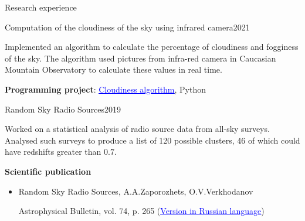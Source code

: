 \documentclass{resume} %
\newcommand{\link}[2]{\href{#1}{\textcolor{blue}{\underline{#2}}}}
\newcommand{\subheader}[2]{
	{\textbf{#1}} \ifthenelse{\equal{#2}{}}{}{\timestamp{#2}}
}
\begin{document}
\begin{rSection}{Research experience}
		\begin{rSubsection}{Computation of the cloudiness of the sky using infrared camera}{2021}{}{}{}
			\item Implemented an algorithm to calculate the percentage of cloudiness and fogginess of the sky. The algorithm used pictures from infra-red camera in Caucasian Mountain Observatory to calculate these values in real time.
			\item \textbf{Programming project}: \link{https://github.com/Kraysent/cloudiness}{Cloudiness algorithm}, Python 
		\end{rSubsection}

		\begin{rSubsection}{Random Sky Radio Sources}{2019}{}{}{}
			\item Worked on a statistical analysis of radio source data from all-sky surveys. Analysed such surveys to produce a list of 120 possible clusters, 46 of which could have redshifts greater than $0.7$.
			\item \subheader{Scientific publication}{}
			\begin{itemize}
				\item Random Sky Radio Sources, A.A.Zaporozhets, O.V.Verkhodanov 
			
				Astrophysical Bulletin, vol. 74, p. 265 (\link{http://www.sao.ru/Doc-k8/Science/Public/Bulletin/Vol74/N3/ASPB265.pdf}{Version in Russian language})
			\end{itemize}	
		\end{rSubsection}
	\end{rSection}
\end{document}
